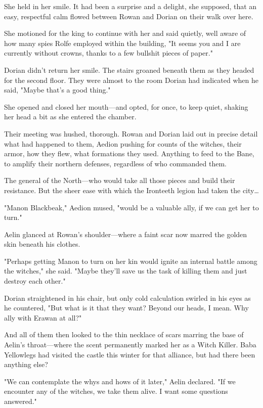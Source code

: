 She held in her smile.
It had been a surprise and a delight, she supposed, that an easy, respectful calm flowed between Rowan and Dorian on their walk over here.

She motioned for the king to continue with her and said quietly, well aware of how many spies Rolfe employed within the building, "It seems you and I are currently without crowns, thanks to a few bullshit pieces of paper."

Dorian didn't return her smile.
The stairs groaned beneath them as they headed for the second floor.
They were almost to the room Dorian had indicated when he said, "Maybe that's a good thing."

She opened and closed her mouth---and opted, for once, to keep quiet, shaking her head a bit as she entered the chamber.

Their meeting was hushed, thorough.
Rowan and Dorian laid out in precise detail what had happened to them, Aedion pushing for counts of the witches, their armor, how they flew, what formations they used.
Anything to feed to the Bane, to amplify their northern defenses, regardless of who commanded them.

The general of the North---who would take all those pieces and build their resistance.
But the sheer ease with which the Ironteeth legion had taken the city\ldots{}

"Manon Blackbeak," Aedion mused, "would be a valuable ally, if we can get her to turn."

Aelin glanced at Rowan's shoulder---where a faint scar now marred the golden skin beneath his clothes.

"Perhaps getting Manon to turn on her kin would ignite an internal battle among the witches," she said.
"Maybe they'll save us the task of killing them and just destroy each other."

Dorian straightened in his chair, but only cold calculation swirled in his eyes as he countered, "But what is it that they want?
Beyond our heads, I mean.
Why ally with Erawan at all?"

And all of them then looked to the thin necklace of scars marring the base of Aelin's throat---where the scent permanently marked her as a Witch Killer.
Baba Yellowlegs had visited the castle this winter for that alliance, but had there been anything else?

"We can contemplate the whys and hows of it later," Aelin declared.
"If we encounter any of the witches, we take them alive.
I want some questions answered."

